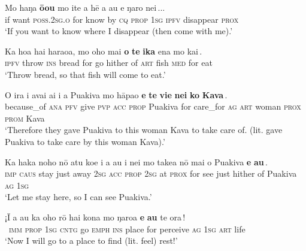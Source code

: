 \ea\label{ex:11.149}
\gll {\ob}Mo haŋa \textbf{ō{\ꞌ}ou} mo {\ꞌ}ite a hē a au e ŋaro nei\,{\cb}...\\
{\db}if want \textsc{poss.2sg.o} for know by \textsc{cq} \textsc{prop} \textsc{1sg} \textsc{ipfv} disappear \textsc{prox}\\

\glt 
‘If you want to know where I disappear (then come with me).’ \textstyleExampleref{[R212.010]} 
\z

\ea\label{ex:11.150}
\gll Ka hoa hai haraoa, {\ob}mo oho mai \textbf{o} \textbf{te} \textbf{ika} ena mo kai\,{\cb}. \\
\textsc{ipfv} throw \textsc{ins} bread {\db}for go hither of \textsc{art} fish \textsc{med} for eat \\

\glt 
‘Throw bread, so that fish will come to eat.’ \textstyleExampleref{[R301.215]} 
\z

\ea\label{ex:11.151}
\gll {\ꞌ}O ira i {\ꞌ}avai ai i a Puakiva {\ob}mo hāpa{\ꞌ}o \textbf{e} \textbf{te} \textbf{vi{\ꞌ}e} \textbf{nei} \textbf{ko} \textbf{Kava}\,{\cb}.\\
because\_of \textsc{ana} \textsc{pfv} give \textsc{pvp} \textsc{acc} \textsc{prop} Puakiva {\db}for care\_for \textsc{ag} \textsc{art} woman \textsc{prox}  \textsc{prom} Kava\\

\glt 
‘Therefore they gave Puakiva to this woman Kava to take care of. (lit. gave Puakiva to take care by this woman Kava).’ \textstyleExampleref{[R229.006]} 
\z

\ea\label{ex:11.152}
\gll Ka haka noho nō atu koe i a au {\ꞌ}i nei {\ob}mo take{\ꞌ}a nō mai  o Puakiva \textbf{e} \textbf{au}\,{\cb}.\\
\textsc{imp} \textsc{caus} stay just away \textsc{2sg} \textsc{acc} \textsc{prop} \textsc{2sg} at \textsc{prox} {\db}for see just hither  of Puakiva \textsc{ag} \textsc{1sg}\\

\glt 
‘Let me stay here, so I can see Puakiva.’ \textstyleExampleref{[R229.013]} 
\z

\ea\label{ex:11.153}
\gll ¡{\ꞌ}Ī a au ka oho rō hai kona {\ob}mo ŋaro{\ꞌ}a \textbf{e} \textbf{au} te ora\,{\cb}! \\
~\textsc{imm} \textsc{prop} \textsc{1sg} \textsc{cntg} go \textsc{emph} \textsc{ins} place {\db}for perceive \textsc{ag} \textsc{1sg} \textsc{art} life \\

\glt 
‘Now I will go to a place to find (lit. feel) rest!’ \textstyleExampleref{[R214.042]} 
\z

